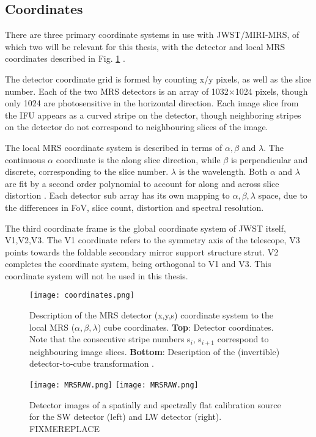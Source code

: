 \subsection{Coordinates}
There are three primary coordinate systems in use with JWST/MIRI-MRS, of which two will be relevant for this thesis, with the detector and local MRS coordinates described in Fig. \ref{fig:mrscoords} \parencite{Argyriou2020}.

The detector coordinate grid is formed by counting x/y pixels, as well as the slice number.
Each of the two MRS detectors is an array of 1032$\times$1024 pixels, though only 1024 are photosensitive in the horizontal direction.
Each image slice from the IFU appears as a curved stripe on the detector, though neighboring stripes on the detector do not correspond to neighbouring slices of the image. 

The local MRS coordinate system is described in terms of $\alpha,\beta$ and $\lambda$. The continuous $\alpha$ coordinate is the along slice direction, while $\beta$ is perpendicular and discrete, corresponding to the slice number. $\lambda$ is the wavelength. Both $\alpha$ and $\lambda$ are fit by a second order polynomial to account for along and across slice distortion \parencite{MIRI6}. Each detector sub array has its own mapping to $\alpha,\beta,\lambda$ space, due to the differences in FoV, slice count, distortion and spectral resolution.

The third coordinate frame is the global coordinate system of JWST itself, V1,V2,V3. The V1 coordinate refers to the symmetry axis of the telescope, V3 points towards the foldable secondary mirror support structure strut. V2 completes the coordinate system, being orthogonal to V1 and V3. This coordinate system will not be used in this thesis.

\begin{figure}[t]
	\texttt{[image: coordinates.png]}
	\caption{Description of the MRS detector (x,y,s) coordinate system to the local MRS ($\alpha,\beta,\lambda$) cube coordinates. \textbf{Top}: Detector coordinates. Note that the consecutive stripe numbers s$_{i}$, s$_{i+1}$ correspond to neighbouring image slices. \textbf{Bottom}: Description of the (invertible) detector-to-cube transformation \parencite{Argyriou2020}.}
	\label{fig:mrscoords}	
\end{figure}

\begin{figure}[t]
	\centering
	\texttt{[image: MRSRAW.png]}
	\texttt{[image: MRSRAW.png]}
	\caption{Detector images of a spatially and spectrally flat calibration source for the SW detector (left) and LW detector (right). FIXMEREPLACE}
	\label{fig:flatfield}
\end{figure}
